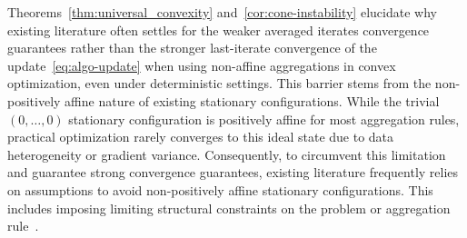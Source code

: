 \documentclass[twoside,11pt]{article}
\let\todo\relax%
\newcommand{\comm}[3][inline]{\todo[#1, size=\tiny]{#2: #3}}
\newcommand{\tb}[1]{\textcolor{orange}{#1}}
\newcommand{\batodo}[2][inline]{\comm[color=magenta,#1]{BL}{#2}}
\begin{document}
Theorems~\ref{thm:universal_convexity} and~\ref{cor:cone-instability} elucidate why existing literature often settles for the weaker averaged iterates convergence guarantees rather than the stronger last-iterate convergence of the update~\eqref{eq:algo-update} when using non-affine aggregations in convex optimization, even under deterministic settings.
This barrier stems from the non-positively affine nature of existing stationary configurations.
While the trivial $(0, \ldots, 0)$ stationary configuration is positively affine for most aggregation rules, practical optimization rarely converges to this ideal state due to data heterogeneity or gradient variance. 
Consequently, to circumvent this limitation and guarantee strong convergence guarantees, existing literature frequently relies on assumptions to avoid non-positively affine stationary configurations.
This includes imposing limiting structural constraints on the problem or aggregation rule~\citep[see, e.g.,][Lemma 5.1; \citealp{koloskova2023revisitingclipping}, Theorem 2.3; \citealp{preobrazhenskaia2026last-iterate-adagrad}, Corollary 4.3]{song2021evading}.
\end{document}
